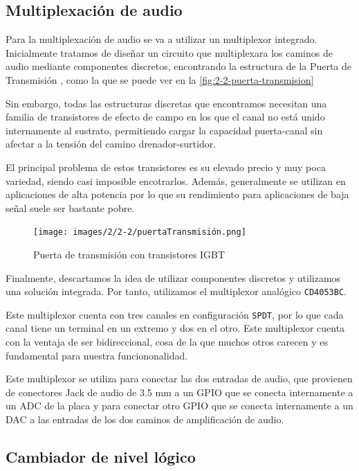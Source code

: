 \subsection{Multiplexación de audio}

Para la multiplexación de audio se va a utilizar un multiplexor integrado. Inicialmente tratamos de diseñar un circuito que multiplexara los caminos de audio mediante componentes discretos, encontrando la estructura de la Puerta de Transmisión \cite{TransmissionGate}, como la que se puede ver en la \autoref{fig:2-2-puerta-transmision}

Sin embargo, todas las estructuras discretas que encontramos necesitan una familia de transistores de efecto de campo en los que el canal no está unido internamente al sustrato, permitiendo cargar la capacidad puerta-canal sin afectar a la tensión del camino drenador-surtidor. 

El principal problema de estos transistores es su elevado precio y muy poca variedad, siendo casi imposible encotrarlos. Además, generalmente se utilizan en aplicaciones de alta potencia por lo que su rendimiento para aplicaciones de baja señal suele ser bastante pobre.

\begin{figure}[h]
    \centering
    \texttt{[image: images/2/2-2/puertaTransmisión.png]}
    \caption{Puerta de transmisión con transistores IGBT}
    \label{fig:2-2-puerta-transmision}
\end{figure}

Finalmente, descartamos la idea de utilizar componentes discretos y utilizamos una solución integrada. Por tanto, utilizamos el multiplexor analógico \texttt{CD4053BC}. \cite{CD4053BDataSheet}

Este multiplexor cuenta con tres canales en configuración \texttt{SPDT}, por lo que cada canal tiene un terminal en un extremo y dos en el otro. Este multiplexor cuenta con la ventaja de ser bidireccional, cosa de la que muchos otros carecen y es fundamental para nuestra funciononalidad.

Este multiplexor se utiliza para conectar las dos entradas de audio, que provienen de conectores Jack de audio de 3.5 mm a un GPIO que se conecta internamente a un ADC de la placa y para conectar otro GPIO que se conecta internamente a un DAC a las entradas de los dos caminos de amplificación de audio. 

\subsection{Cambiador de nivel lógico}

